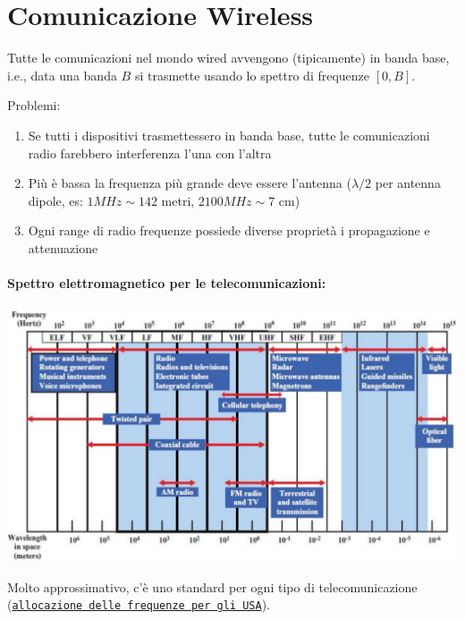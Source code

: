 \section{Comunicazione Wireless}
Tutte le comunicazioni nel mondo wired avvengono (tipicamente) in banda base, i.e., data una banda $B$ si trasmette usando lo spettro di frequenze $[0,B]$. 

Problemi:
\begin{enumerate}
	\item Se tutti i dispositivi trasmettessero in banda base, tutte le comunicazioni radio farebbero interferenza l'una con l'altra
	
    \item Più è bassa la frequenza più grande deve essere l'antenna ($\lambda/2$ per antenna dipole, es: $1MHz \sim 142$ metri, $2100MHz \sim 7$ cm)
	
    \item Ogni range di radio frequenze possiede diverse proprietà i propagazione e attenuazione
\end{enumerate}

\paragraph{Spettro elettromagnetico per le telecomunicazioni:}
\begin{center}
	\includegraphics[width=0.98\linewidth]{img/wireless/emspectrum1}
\end{center}

Molto approssimativo, c'è uno standard per ogni tipo di telecomunicazione (\href{https://upload.wikimedia.org/wikipedia/commons/thumb/c/c7/United_States_Frequency_Allocations_Chart_2016_-_The_Radio_Spectrum.pdf/page1-1200px-United_States_Frequency_Allocations_Chart_2016_-_The_Radio_Spectrum.pdf.jpg}{\texttt{allocazione delle frequenze per gli USA}}).

